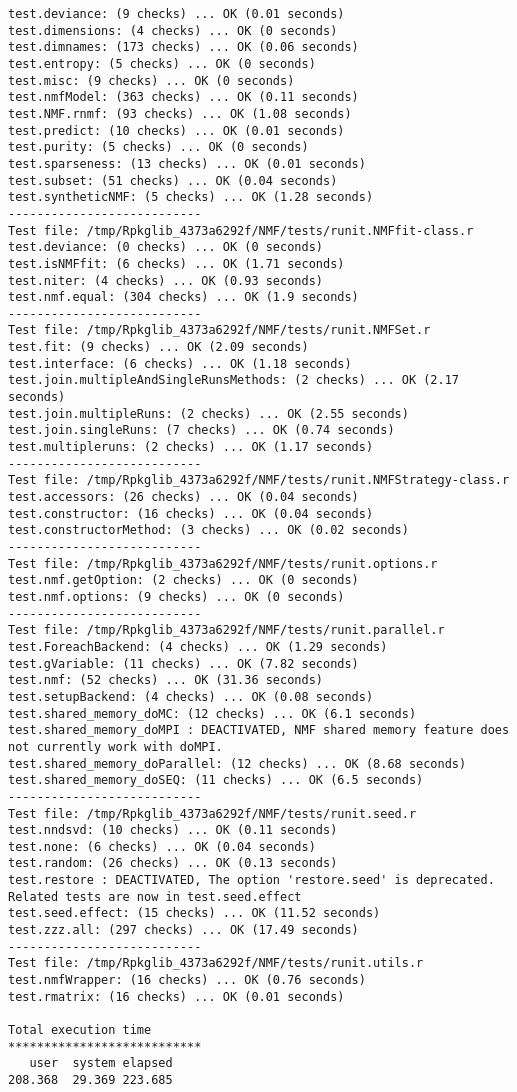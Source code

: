 \documentclass[10pt]{article}
\begin{document}
\begin{verbatim}
test.deviance: (9 checks) ... OK (0.01 seconds)
test.dimensions: (4 checks) ... OK (0 seconds)
test.dimnames: (173 checks) ... OK (0.06 seconds)
test.entropy: (5 checks) ... OK (0 seconds)
test.misc: (9 checks) ... OK (0 seconds)
test.nmfModel: (363 checks) ... OK (0.11 seconds)
test.NMF.rnmf: (93 checks) ... OK (1.08 seconds)
test.predict: (10 checks) ... OK (0.01 seconds)
test.purity: (5 checks) ... OK (0 seconds)
test.sparseness: (13 checks) ... OK (0.01 seconds)
test.subset: (51 checks) ... OK (0.04 seconds)
test.syntheticNMF: (5 checks) ... OK (1.28 seconds)
--------------------------- 
Test file: /tmp/Rpkglib_4373a6292f/NMF/tests/runit.NMFfit-class.r 
test.deviance: (0 checks) ... OK (0 seconds)
test.isNMFfit: (6 checks) ... OK (1.71 seconds)
test.niter: (4 checks) ... OK (0.93 seconds)
test.nmf.equal: (304 checks) ... OK (1.9 seconds)
--------------------------- 
Test file: /tmp/Rpkglib_4373a6292f/NMF/tests/runit.NMFSet.r 
test.fit: (9 checks) ... OK (2.09 seconds)
test.interface: (6 checks) ... OK (1.18 seconds)
test.join.multipleAndSingleRunsMethods: (2 checks) ... OK (2.17 seconds)
test.join.multipleRuns: (2 checks) ... OK (2.55 seconds)
test.join.singleRuns: (7 checks) ... OK (0.74 seconds)
test.multipleruns: (2 checks) ... OK (1.17 seconds)
--------------------------- 
Test file: /tmp/Rpkglib_4373a6292f/NMF/tests/runit.NMFStrategy-class.r 
test.accessors: (26 checks) ... OK (0.04 seconds)
test.constructor: (16 checks) ... OK (0.04 seconds)
test.constructorMethod: (3 checks) ... OK (0.02 seconds)
--------------------------- 
Test file: /tmp/Rpkglib_4373a6292f/NMF/tests/runit.options.r 
test.nmf.getOption: (2 checks) ... OK (0 seconds)
test.nmf.options: (9 checks) ... OK (0 seconds)
--------------------------- 
Test file: /tmp/Rpkglib_4373a6292f/NMF/tests/runit.parallel.r 
test.ForeachBackend: (4 checks) ... OK (1.29 seconds)
test.gVariable: (11 checks) ... OK (7.82 seconds)
test.nmf: (52 checks) ... OK (31.36 seconds)
test.setupBackend: (4 checks) ... OK (0.08 seconds)
test.shared_memory_doMC: (12 checks) ... OK (6.1 seconds)
test.shared_memory_doMPI : DEACTIVATED, NMF shared memory feature does not currently work with doMPI.
test.shared_memory_doParallel: (12 checks) ... OK (8.68 seconds)
test.shared_memory_doSEQ: (11 checks) ... OK (6.5 seconds)
--------------------------- 
Test file: /tmp/Rpkglib_4373a6292f/NMF/tests/runit.seed.r 
test.nndsvd: (10 checks) ... OK (0.11 seconds)
test.none: (6 checks) ... OK (0.04 seconds)
test.random: (26 checks) ... OK (0.13 seconds)
test.restore : DEACTIVATED, The option 'restore.seed' is deprecated. Related tests are now in test.seed.effect
test.seed.effect: (15 checks) ... OK (11.52 seconds)
test.zzz.all: (297 checks) ... OK (17.49 seconds)
--------------------------- 
Test file: /tmp/Rpkglib_4373a6292f/NMF/tests/runit.utils.r 
test.nmfWrapper: (16 checks) ... OK (0.76 seconds)
test.rmatrix: (16 checks) ... OK (0.01 seconds)

Total execution time
***************************
   user  system elapsed 
208.368  29.369 223.685 

\end{verbatim}
\end{document}

